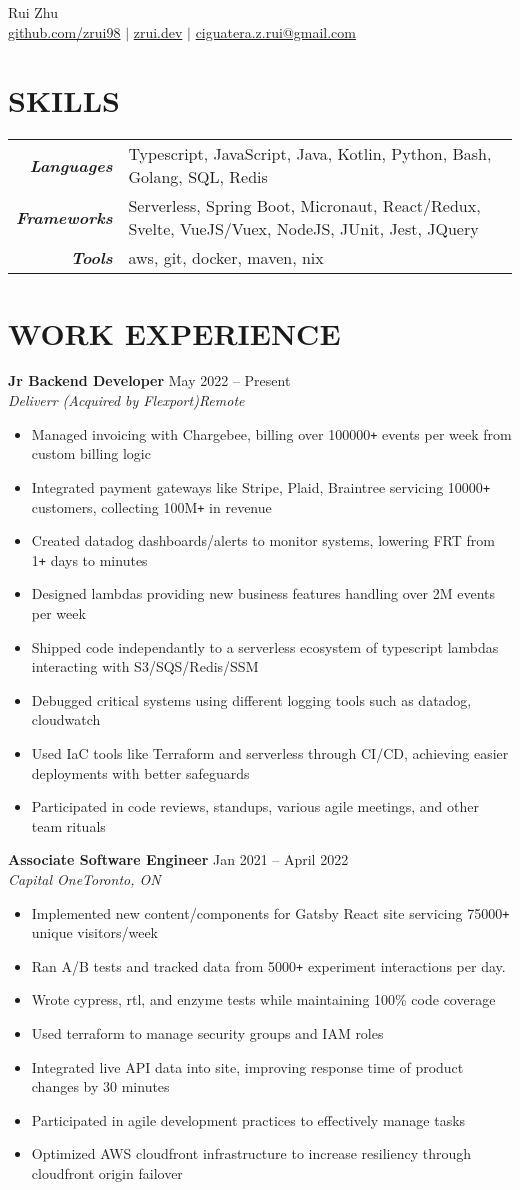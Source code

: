 \documentclass[letterpaper]{article}
\newcommand{\Header}[2]{\begin{center}
	\huge\usefont{OT1}{lmss}{m}{n}
		#1 \\
	\small{#2}
\end{center}}
\newcommand{\SplitEntry}[2]{\textbf{\textit{#1}} & \small{#2}\\}
\newcommand{\NewPart}[1]{\section*{\large\uppercase{\textbf{#1}}}}
\newcommand{\DatedEntry}[5]{\small\textbf{#1}
	\hfill \small{#2}\\
	\textit{#3}\hfill\textit{#4}\\\vspace{0.1cm}
	#5\vspace{0.1cm}
}
\begin{document}
\Header{Rui Zhu}{\href{https://github.com/zrui98}{github.com/zrui98} $|$ \href{https://zrui.dev}{zrui.dev} $|$ \href{mailto:ciguatera.z.rui@gmail.ca}{ciguatera.z.rui@gmail.com}}\vspace{-0.5cm}

\NewPart{Skills}
\begin{tabular}{r|l}
	\SplitEntry{Languages}{Typescript, JavaScript, Java, Kotlin, Python, Bash, Golang, SQL, Redis}
	\SplitEntry{Frameworks}{Serverless, Spring Boot, Micronaut, React/Redux, Svelte, VueJS/Vuex, NodeJS, JUnit, Jest, JQuery}
	\SplitEntry{Tools}{aws, git, docker, maven, nix}
\end{tabular}\vspace{-0.2cm}

\NewPart{Work Experience}
\DatedEntry{Jr Backend Developer}
{May 2022 -- Present}
{Deliverr (Acquired by Flexport)}
{Remote}
{\begin{itemize}[nolistsep]
	\item Managed invoicing with Chargebee, billing over 100000\texttt{+} events per week from custom billing logic
	\item Integrated payment gateways like Stripe, Plaid, Braintree servicing 10000\texttt{+} customers, collecting 100M\texttt{+} in revenue
	\item Created datadog dashboards/alerts to monitor systems, lowering FRT from 1\texttt{+} days to minutes
	\item Designed lambdas providing new business features handling over 2M events per week
	\item Shipped code independantly to a serverless ecosystem of typescript lambdas interacting with S3/SQS/Redis/SSM
	\item Debugged critical systems using different logging tools such as datadog, cloudwatch
	\item Used IaC tools like Terraform and serverless through CI/CD, achieving easier deployments with better safeguards
	\item Participated in code reviews, standups, various agile meetings, and other team rituals
\end{itemize}}
\DatedEntry{Associate Software Engineer}
{Jan 2021 -- April 2022}
{Capital One}
{Toronto, ON}
{\begin{itemize}[nolistsep]
	\item Implemented new content/components for Gatsby React site servicing 75000\texttt{+} unique visitors/week
	\item Ran A/B tests and tracked data from 5000\texttt{+} experiment interactions per day.
	\item Wrote cypress, rtl, and enzyme tests while maintaining 100\% code coverage
	\item Used terraform to manage security groups and IAM roles
	\item Integrated live API data into site, improving response time of product changes by 30 minutes
	\item Participated in agile development practices to effectively manage tasks 
	\item Optimized AWS cloudfront infrastructure to increase resiliency through cloudfront origin failover
\end{itemize}}
\end{document}
